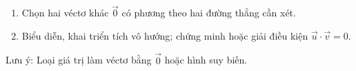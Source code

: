 \begin{enumerate}
\item Chọn hai véctơ khác $\overrightarrow{0}$ có phương theo hai đường thẳng cần xét.
\item Biểu diễn, khai triển tích vô hướng; chứng minh hoặc giải điều kiện $\overrightarrow{u}\cdot\overrightarrow{v}=0$.
\end{enumerate}
Lưu ý: Loại giá trị làm véctơ bằng $\overrightarrow{0}$ hoặc hình suy biến.
